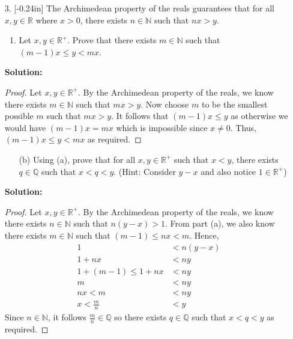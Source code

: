 \documentclass[letterpaper,12pt]{article}
\theoremstyle{definition}
\begin{document}
\begin{enumerate}
    \item[3.]  \reversemarginpar{}[-0.24in] The Archimedean property of the reals guarantees that for all $x,y \in \mathbb{R}$ where $x > 0$, there exists $n \in \mathbb{N}$ such that $nx > y$. \begin{enumerate}
        \item Let $x,y \in \mathbb{R}^+$. Prove that there exists $m \in \mathbb{N}$ such that $(m-1)x \leq y < mx$.
        \end{enumerate}
         \begin{mdframed}
            \textbf{Solution:}
            \begin{proof}
                Let $x,y \in \mathbb{R}^+$. By the Archimedean property of the reals, we know there exists $m \in \mathbb{N}$ such that $mx > y$. Now choose $m$ to be the smallest possible $m$ such that $mx > y$. It follows that $(m-1)x \leq y$ as otherwise we would have $(m-1)x = mx$ which is impossible since $x \neq 0$. Thus, $(m-1)x \leq y < mx$ as required.
            \end{proof}
        \end{mdframed}
        \vspace{1in}
    \begin{enumerate}
        \item[(b)] Using (a), prove that for all $x,y \in \mathbb{R}^+$ such that $x<y$, there exists $q \in \mathbb{Q}$ such that $x < q < y$. (Hint: Consider $y-x$ and also notice $1 \in \mathbb{R}^+$)
    \end{enumerate}
    \begin{mdframed}
            \textbf{Solution:}
            \begin{proof}
                Let $x,y \in \mathbb{R}^+$. By the Archimedean property of the reals, we know there exists $n \in \mathbb{N}$ such that $n(y-x) > 1$. From part (a), we also know there exists $m \in \mathbb{N}$ such that $(m-1) \leq nx < m$. Hence, \begin{align*}
                    1 &< n(y-x) \\
                    1+nx &< ny \\
                  1 + (m-1) \leq  1+nx &< ny \\
                  m &< ny \\
                  nx < m &< ny \\
                  x < \frac{m}{n} &< y
                \end{align*}
                Since $n \in \mathbb{N}$, it follows $\frac{m}{n} \in \mathbb{Q}$ so there exists $q \in \mathbb{Q}$ such that $x < q < y$ as required.
            \end{proof}
        \end{mdframed}
\end{enumerate}
\end{document}

